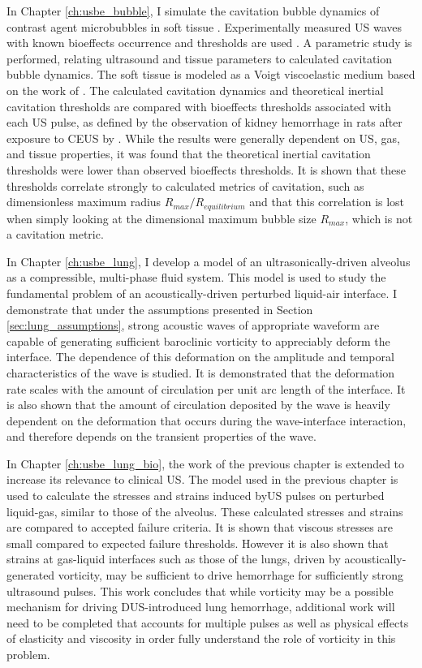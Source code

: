 In Chapter \ref{ch:usbe_bubble}, I simulate the cavitation bubble
dynamics of contrast agent microbubbles in soft tissue
\citep{Patterson2012}. Experimentally measured \ac{US} waves with
known bioeffects occurrence and thresholds are used
\cite{Miller2008b}.  A parametric study is performed, relating
ultrasound and tissue parameters to calculated cavitation bubble
dynamics. The soft tissue is modeled as a Voigt viscoelastic medium
based on the work of \cite{Yang2005}. The calculated cavitation
dynamics and theoretical inertial cavitation thresholds
\citep{Flynn1982,Apfel1982} are compared with bioeffects thresholds
associated with each \ac{US} pulse, as defined by the observation of
kidney hemorrhage in rats after exposure to CEUS by
\cite{Miller2008b}. While the results were generally dependent on
\ac{US}, gas, and tissue properties, it was found that the theoretical
inertial cavitation thresholds were lower than observed bioeffects
thresholds. It is shown that these thresholds correlate strongly to
calculated metrics of cavitation, such as dimensionless maximum radius
$R_{max}/R_{equilibrium}$ and that this correlation is lost when
simply looking at the dimensional maximum bubble size $R_{max}$, which
is not a cavitation metric.

In Chapter \ref{ch:usbe_lung}, I develop a model of an
ultrasonically-driven alveolus as a compressible, multi-phase fluid
system. This model is used to study the fundamental problem of an
acoustically-driven perturbed liquid-air interface. I demonstrate that
under the assumptions presented in Section \ref{sec:lung_assumptions},
strong acoustic waves of appropriate waveform are capable of
generating sufficient baroclinic vorticity to appreciably deform the
interface. The dependence of this deformation on the amplitude and
temporal characteristics of the wave is studied. It is demonstrated
that the deformation rate scales with the amount of circulation per
unit arc length of the interface. It is also shown that the amount of
circulation deposited by the wave is heavily dependent on the
deformation that occurs during the wave-interface interaction, and
therefore depends on the transient properties of the wave.

In Chapter \ref{ch:usbe_lung_bio}, the work of the previous chapter is
extended to increase its relevance to clinical \ac{US}. The model used
in the previous chapter is used to calculate the stresses and strains
induced by\ac{US} pulses on perturbed liquid-gas, similar to those of
the alveolus. These calculated stresses and strains are compared to
accepted failure criteria. It is shown that viscous stresses are small
compared to expected failure thresholds. However it is also shown that
strains at gas-liquid interfaces such as those of the lungs, driven by
acoustically-generated vorticity, may be sufficient to drive
hemorrhage for sufficiently strong ultrasound pulses. This work
concludes that while vorticity may be a possible mechanism for driving
\ac{DUS}-introduced lung hemorrhage, additional work will need to be
completed that accounts for multiple pulses as well as physical
effects of elasticity and viscosity in order fully understand the role
of vorticity in this problem.

